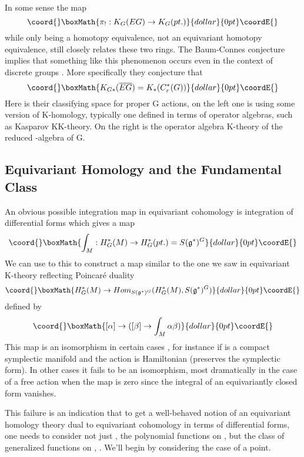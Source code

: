 \documentclass[a4paper,a4paper]{article}
\theoremstyle{conjecture}
\begin{document}
In some sense the map
$$\coord{}\boxMath{\pi_!:K_G(EG)\rightarrow K_G(pt.)}{dollar}{0pt}\coordE{}$$
while only being a homotopy equivalence, not an equivariant homotopy
equivalence, still closely relates these two rings.  
The Baum-Connes conjecture implies that something like this phenomenon occurs even in the
context of discrete groups \coordHE{}. More specifically they conjecture \cite{BCH} that
$$\coord{}\boxMath{K_{G*}(\overline{EG})=K_*(C_r^*(G))}{dollar}{0pt}\coordE{}$$
Here \coordHE{} is their classifying space for proper G
actions, on the left one is using some version of K-homology,
typically one defined in terms of operator algebras, such as
Kasparov KK-theory. On the right is the operator algebra K-theory
of the reduced \coordHE{}-algebra of G.


\subsection {Equivariant Homology and the Fundamental Class}

An obvious possible integration map in equivariant cohomology is
integration of differential forms which gives a map
$$\coord{}\boxMath{\int_M:H^*_G(M)\rightarrow H^*_G(pt.)=S(\mathfrak g^*)^G}{dollar}{0pt}\coordE{}$$
We can use to this to construct a map similar to the one we saw in equivariant K-theory reflecting
Poincar\'e duality
$$\coord{}\boxMath{H^*_G(M)\rightarrow Hom _{S(\mathfrak g^*)^G}(H^*_G(M),S(\mathfrak g^*)^G)}{dollar}{0pt}\coordE{}$$
defined by
$$\coord{}\boxMath{[\alpha]\rightarrow ([\beta]\rightarrow \int_M \alpha\beta)}{dollar}{0pt}\coordE{}$$
This map is an isomorphism in certain cases \cite{Ginzburg}, for instance
if \coordHE{} is a compact symplectic manifold and the \coordHE{} action is Hamiltonian (preserves
the symplectic form).  In other cases it fails to be an isomorphism, most dramatically
in the case of a free \coordHE{} action when the map is zero since the integral of an equivariantly
closed form vanishes.  

This failure is an indication that to get a well-behaved notion of an
equivariant homology theory dual to equivariant cohomology in terms of differential
forms, one needs to consider not just \coordHE{}, the polynomial functions on \coordHE{}, but the
class of generalized functions on \coordHE{}, \coordHE{}.  We'll begin by considering the
case of a point.
\end{document}
